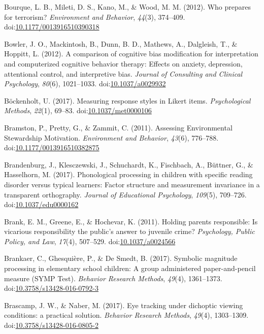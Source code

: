 \documentclass[english,man]{apa6}
\begin{document}
\hypertarget{ref-Bourque2012}{}
Bourque, L. B., Mileti, D. S., Kano, M., \& Wood, M. M. (2012). Who
prepares for terrorism? \emph{Environment and Behavior}, \emph{44}(3),
374--409.
doi:\href{https://doi.org/10.1177/0013916510390318}{10.1177/0013916510390318}

\hypertarget{ref-Bowler2012}{}
Bowler, J. O., Mackintosh, B., Dunn, B. D., Mathews, A., Dalgleish, T.,
\& Hoppitt, L. (2012). A comparison of cognitive bias modification for
interpretation and computerized cognitive behavior therapy: Effects on
anxiety, depression, attentional control, and interpretive bias.
\emph{Journal of Consulting and Clinical Psychology}, \emph{80}(6),
1021--1033.
doi:\href{https://doi.org/10.1037/a0029932}{10.1037/a0029932}

\hypertarget{ref-Bockenholt2017}{}
Böckenholt, U. (2017). Measuring response styles in Likert items.
\emph{Psychological Methods}, \emph{22}(1), 69--83.
doi:\href{https://doi.org/10.1037/met0000106}{10.1037/met0000106}

\hypertarget{ref-Bramston2011}{}
Bramston, P., Pretty, G., \& Zammit, C. (2011). Assessing Environmental
Stewardship Motivation. \emph{Environment and Behavior}, \emph{43}(6),
776--788.
doi:\href{https://doi.org/10.1177/0013916510382875}{10.1177/0013916510382875}

\hypertarget{ref-Brandenburg2017}{}
Brandenburg, J., Klesczewski, J., Schuchardt, K., Fischbach, A.,
Büttner, G., \& Hasselhorn, M. (2017). Phonological processing in
children with specific reading disorder versus typical learners: Factor
structure and measurement invariance in a transparent orthography.
\emph{Journal of Educational Psychology}, \emph{109}(5), 709--726.
doi:\href{https://doi.org/10.1037/edu0000162}{10.1037/edu0000162}

\hypertarget{ref-Brank2011}{}
Brank, E. M., Greene, E., \& Hochevar, K. (2011). Holding parents
responsible: Is vicarious responsibility the public's answer to juvenile
crime? \emph{Psychology, Public Policy, and Law}, \emph{17}(4),
507--529. doi:\href{https://doi.org/10.1037/a0024566}{10.1037/a0024566}

\hypertarget{ref-Brankaer2016}{}
Brankaer, C., Ghesquière, P., \& De Smedt, B. (2017). Symbolic magnitude
processing in elementary school children: A group administered
paper-and-pencil measure (SYMP Test). \emph{Behavior Research Methods},
\emph{49}(4), 1361--1373.
doi:\href{https://doi.org/10.3758/s13428-016-0792-3}{10.3758/s13428-016-0792-3}

\hypertarget{ref-Brascamp2017a}{}
Brascamp, J. W., \& Naber, M. (2017). Eye tracking under dichoptic
viewing conditions: a practical solution. \emph{Behavior Research
Methods}, \emph{49}(4), 1303--1309.
doi:\href{https://doi.org/10.3758/s13428-016-0805-2}{10.3758/s13428-016-0805-2}
\end{document}
